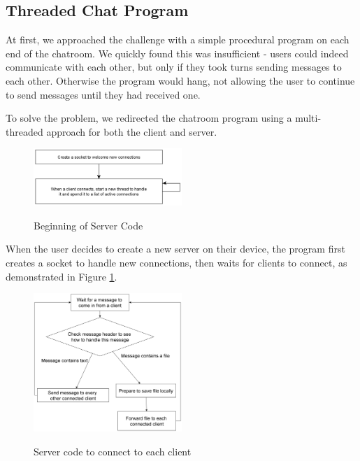 \documentclass{article}
\begin{document}




\subsection{Threaded Chat Program}

At first, we approached the challenge with a simple procedural program on each end of the chatroom. We quickly found this was insufficient - users could indeed communicate with each other, but only if they took turns sending messages to each other. Otherwise the program would hang, not allowing the user to continue to send messages until they had received one.

To solve the problem, we redirected the chatroom program using a multi-threaded approach for both the client and server.

\begin{figure}[h]
\caption{Beginning of Server Code}
\centering
\includegraphics[width=0.5\textwidth]{media/serverFlowchart2.png}
\label{server2}
\end{figure}

When the user decides to create a new server on their device, the program first creates a socket to handle new connections, then waits for clients to connect, as demonstrated in Figure \ref{server2}.

\begin{figure}[h]
\caption{Server code to connect to each client}
\centering
\includegraphics[width=0.5\textwidth]{media/serverFlowchart1.png}
\label{server1}
\end{figure}
\end{document}
